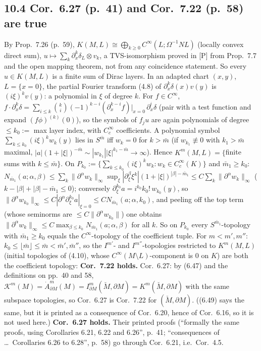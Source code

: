 \documentclass[11pt]{article}
\newcommand{\Mb}{\breve{M}}
\begin{document}
\subsection*{10.4 Cor.~6.27 (p.~41) and Cor.~7.22 (p.~58) are true}
By Prop.~7.26 (p.~59), $K(M,L)\cong\bigoplus_{k\ge0}C^\infty(L;\Omega^{-1}NL)$ (locally convex direct sum), $u\mapsto\sum_k\partial_x^k\delta_L\otimes v_k$, a TVS-isomorphism proved in [P] from Prop.~7.7 and the open mapping theorem, not from any coincidence statement. So every $u\in K(M,L)$ is a finite sum of Dirac layers. In an adapted chart $(x,y)$, $L=\{x=0\}$, the partial Fourier transform (4.8) of $\partial_x^k\delta(x)v(y)$ is $(i\xi)^kv(y)$: a polynomial in $\xi$ of degree $k$. For $f\in C^\infty$, $f\cdot\partial_x^k\delta=\sum_{i\le k}\binom ki(-1)^{k-i}(\partial_x^{k-i}f)|_{x=0}\,\partial_x^i\delta$ (pair with a test function and expand $(f\phi)^{(k)}(0)$), so the symbols of $f_ju$ are again polynomials of degree $\le k_0:=$ max layer index, with $C_c^\infty$ coefficients. A polynomial symbol $\sum_{k\le k_0}(i\xi)^kw_k(y)$ lies in $S^{\bar m}$ iff $w_k=0$ for $k>\bar m$ (if $w_{k_1}\not\equiv0$ with $k_1>\bar m$ maximal, $|a|(1+|\xi|)^{-\bar m}\sim|w_{k_1}||\xi|^{k_1-\bar m}\to\infty$). Hence $K^m(M,L)=\{$finite sums with $k\le\bar m\}$. On $P_{k_0}:=\{\sum_{k\le k_0}(i\xi)^kw_k:w_k\in C_c^\infty(K)\}$ and $\bar m_1\ge k_0$: $N_{\bar m_1}(a;\alpha,\beta)\le\sum_k\|\partial^\alpha w_k\|_\infty\sup_\xi|\partial_\xi^\beta\xi^k|(1+|\xi|)^{|\beta|-\bar m_1}\le C\sum_k\|\partial^\alpha w_k\|_\infty$ ($k-|\beta|+|\beta|-\bar m_1\le0$); conversely $\partial_\xi^{k_0}a=i^{k_0}k_0!\,w_{k_0}(y)$, so $\|\partial^\alpha w_{k_0}\|_\infty\le C|\partial^\alpha\partial_\xi^{k_0}a|_{\xi=0}\le CN_{\bar m_1}(a;\alpha,k_0)$, and peeling off the top term (whose seminorms are $\le C\|\partial^\alpha w_{k_0}\|$) one obtains $\|\partial^\alpha w_k\|_\infty\le C\max_{\beta\le k_0}N_{\bar m_1}(a;\alpha,\beta)$ for all $k$. So on $P_{k_0}$ every $S^{\bar m_1}$-topology with $\bar m_1\ge k_0$ equals the $C^\infty$-topology of the coefficient tuple. For $m<m',m''$: $k_0\le\lfloor\bar m\rfloor\le\bar m<\bar m',\bar m''$, so the $I^{m'}$- and $I^{m''}$-topologies restricted to $K^m(M,L)$ (initial topologies of (4.10), whose $C^\infty(M\setminus L)$-component is $0$ on $K$) are both the coefficient topology: \textbf{Cor.~7.22 holds.} Cor.~6.27: by (6.47) and the definitions on pp.~40 and 58, $\mathcal K^m(M)=\dot A^m_{\partial M}(M)=I^m_{\partial M}(\Mb,\partial M)=K^m(\Mb,\partial M)$ with the same subspace topologies, so Cor.~6.27 is Cor.~7.22 for $(\Mb,\partial M)$. ((6.49) says the same, but it is printed as a consequence of Cor.~6.20, hence of Cor.~6.16, so it is not used here.) \textbf{Cor.~6.27 holds.} Their printed proofs (``formally the same proofs, using Corollaries 6.21, 6.22 and 6.26'', p.~41; ``consequences of \dots\ Corollaries 6.26 to 6.28'', p.~58) go through Cor.~6.21, i.e.\ Cor.~4.5.
\end{document}
